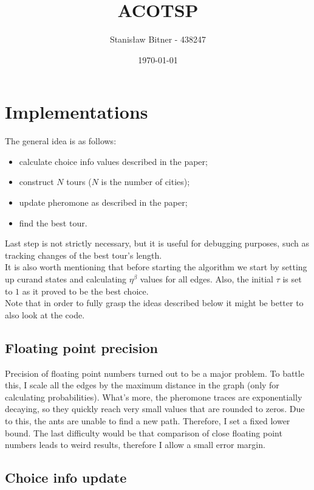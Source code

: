 \documentclass[12pt, a4paper]{article}
\title{ACOTSP}
\author{Stanisław Bitner - 438247}
\date{\today}
\begin{document}
\maketitle

\section*{Implementations}

The general idea is as follows:
\begin{itemize}
    \item calculate choice info values described in the paper;
    \item construct $N$ tours ($N$ is the number of cities);
    \item update pheromone as described in the paper;
    \item find the best tour.
\end{itemize}

Last step is not strictly necessary, but it is useful for debugging purposes,
such as tracking changes of the best tour's length.\\
It is also worth mentioning that before starting the algorithm we start by
setting up curand states and calculating $\eta^\beta$ values for all edges.
Also, the initial $\tau$ is set to $1$ as it proved to be the best choice.\\
Note that in order to fully grasp the ideas described below it might be better
to also look at the code.

\subsection*{Floating point precision}

Precision of floating point numbers turned out to be a major problem. To battle
this, I scale all the edges by the maximum distance in the graph (only for
calculating probabilities). What's more, the pheromone traces are exponentially
decaying, so they quickly reach very small values that are rounded to zeros.
Due to this, the ants are unable to find a new path. Therefore, I set a fixed
lower bound. The last difficulty would be that comparison of close floating point
numbers leads to weird results, therefore I allow a small error margin.

\subsection*{Choice info update}
\end{document}
